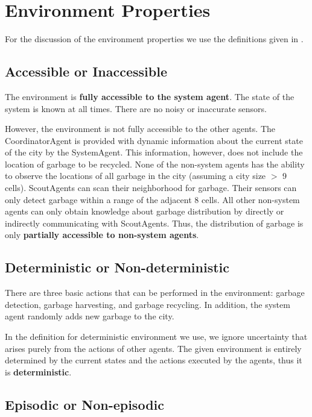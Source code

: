 \section{Environment Properties}

For the discussion of the environment properties we use the definitions given in \cite{RusselNorvig2010}.

\subsection{Accessible or Inaccessible}

The environment is \textbf{fully accessible to the system agent}. The state of the system is known at all times. There are no noisy or inaccurate sensors.

However, the environment is not fully accessible to the other agents. The CoordinatorAgent is provided with dynamic information about the current state of the city by the SystemAgent. This information, however, does not include the location of garbage to be recycled. None of the non-system agents has the ability to observe the locations of all garbage in the city (assuming a city size $ > $ 9 cells). ScoutAgents can scan their neighborhood for garbage. Their sensors can only detect garbage within a range of the adjacent 8 cells. All other non-system agents can only obtain knowledge about garbage distribution by directly or indirectly communicating with ScoutAgents. Thus, the distribution of garbage is only \textbf{partially accessible to non-system agents}.


\subsection{Deterministic or Non-deterministic}

There are three basic actions that can be performed in the environment: garbage detection, garbage harvesting, and garbage recycling. In addition, the system agent randomly adds new garbage to the city.

In the definition for deterministic environment we use, we ignore uncertainty that arises purely from the actions of other agents. The given environment is entirely determined by the current states and the actions executed by the agents, thus it is \textbf{deterministic}.


\subsection{Episodic or Non-episodic}

